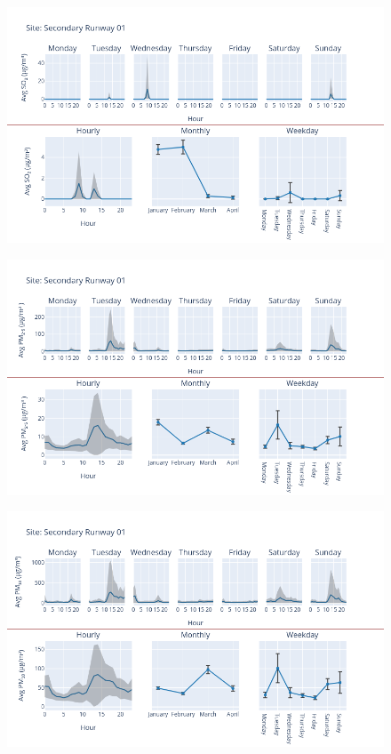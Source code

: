 \documentclass[12pt, oneside]{book}
\begin{document}
{ 
{\begin{figure}[H] 
 \centering 
\includegraphics[width=.88\textwidth, keepaspectratio]{image161} 
 \end{figure}}{} 

{\begin{figure}[H] 
 \centering 
\includegraphics[width=.88\textwidth, keepaspectratio]{image162} 
 \end{figure}}{} 

{\begin{figure}[H] 
 \centering 
\includegraphics[width=.88\textwidth, keepaspectratio]{image163} 
 \end{figure}}{} 

}
\end{document}
